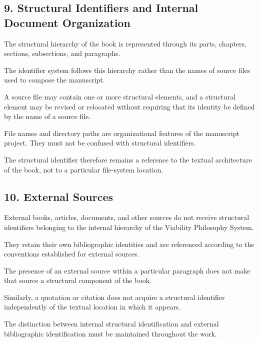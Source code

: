 \subsection*{9. Structural Identifiers and
Internal Document Organization}

The structural hierarchy of the
book is represented through its
parts, chapters, sections,
subsections, and paragraphs.

The identifier system follows
this hierarchy rather than
the names of source files used
to compose the manuscript.

A source file may contain one
or more structural elements,
and a structural element may
be revised or relocated without
requiring that its identity be
defined by the name of a source
file.

File names and directory paths
are organizational features of
the manuscript project. They
must not be confused with
structural identifiers.

The structural identifier
therefore remains a reference
to the textual architecture
of the book, not to a particular
file-system location.


\subsection*{10. External Sources}

External books, articles, documents,
and other sources do not receive
structural identifiers belonging
to the internal hierarchy of
the Viability Philosophy System.

They retain their own bibliographic
identities and are referenced
according to the conventions
established for external sources.

The presence of an external source
within a particular paragraph
does not make that source a
structural component of the book.

Similarly, a quotation or citation
does not acquire a structural
identifier independently of
the textual location in which
it appears.

The distinction between internal
structural identification and
external bibliographic identification
must be maintained throughout
the work.


